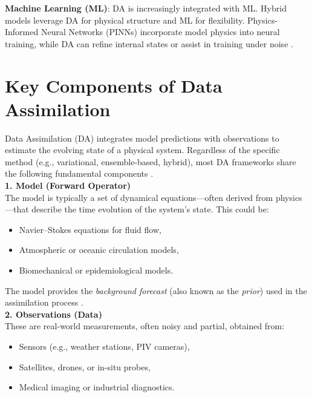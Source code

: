 \documentclass[a4paper]{article}
\begin{document}
\textbf{Machine Learning (ML)}: DA is increasingly integrated with ML. Hybrid models leverage DA for 
physical structure and ML for flexibility. Physics-Informed Neural Networks (PINNs) incorporate model physics 
into neural training, while DA can refine internal states or assist in training under noise \parencite{raissi2019physics, benner2015survey}.

\section{Key Components of Data Assimilation}

Data Assimilation (DA) integrates model predictions with observations to estimate the evolving state of a physical 
system. Regardless of the specific method (e.g., variational, ensemble-based, hybrid), most DA frameworks share the 
following fundamental components \parencite{kalnay2003atmospheric, evensen1994sequential, wikle2007bayesian}.\\

\textbf{1. Model (Forward Operator)}\\

The model is typically a set of dynamical equations—often derived from physics—that describe the time evolution of 
the system's state. This could be:\\

\begin{itemize}
  \item Navier–Stokes equations for fluid flow,
  \item Atmospheric or oceanic circulation models,
  \item Biomechanical or epidemiological models.
\end{itemize}

The model provides the \textit{background forecast} (also known as the \textit{prior}) used in the assimilation 
process \parencite{kalnay2003atmospheric}.\\

\textbf{2. Observations (Data)}\\

These are real-world measurements, often noisy and partial, obtained from:
\begin{itemize}
  \item Sensors (e.g., weather stations, PIV cameras),
  \item Satellites, drones, or in-situ probes,
  \item Medical imaging or industrial diagnostics.
\end{itemize}
\end{document}
